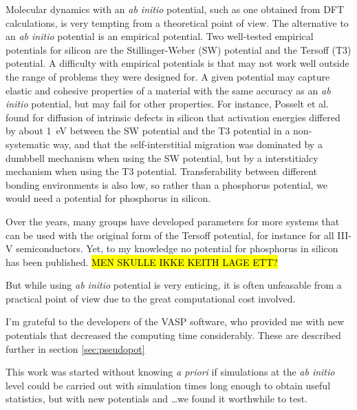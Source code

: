 \documentclass[11pt,bibliography=totoc,index=totoc]{scrbook}   %
\newcommand{\comment}[1]{\hl{#1}}
\begin{document}

Molecular dynamics with an \textit{ab initio} potential, such as one obtained from DFT calculations, is very tempting from a theoretical point of view. 
The alternative to an \textit{ab initio} potential is an empirical potential. 
Two well-tested empirical potentials for silicon are the Stillinger-Weber (SW) potential\cite{Stillinger:1985} and the Tersoff (T3) potential.\cite{Tersoff} 
A difficulty with empirical potentials is that may not work well outside the range of problems they were designed for.
A given potential may capture elastic and cohesive properties of a material with the same accuracy as an \textit{ab initio} potential, but may fail for other properties.\cite{Powell:2007}
For instance, Posselt et al. found for diffusion of intrinsic defects in silicon that activation energies differed by about 1~eV between the SW potential and the T3 potential in a non-systematic way, and that the self-interstitial migration was dominated by a dumbbell mechanism when using the SW potential, but by a interstitialcy mechanism when using the T3 potential.\cite{Posselt:2008}
Transferability between different bonding environments is also low, so rather than a phosphorus potential, we would need a potential for phosphorus in silicon.

Over the years, many groups have developed parameters for more systems that can be used with the original form of the Tersoff potential, for instance for all III-V semiconductors.\cite{Powell:2007}
Yet, to my knowledge no potential for phosphorus in silicon has been published.
\comment{MEN SKULLE IKKE KEITH LAGE ETT?}


But while using \textit{ab initio} potential is very enticing, it is often unfeasable from a practical point of view due to the great computational cost involved.

I'm grateful to the developers of the VASP software, who provided me with new potentials that decreased the computing time considerably. These are described further in section \ref{sec:pseudopot}

This work was started without knowing \textit{a priori} if simulations at the \textit{ab initio} level could be carried out with simulation times long enough to obtain useful statistics, but with new potentials and \ldots we found it worthwhile to test.
\end{document}
